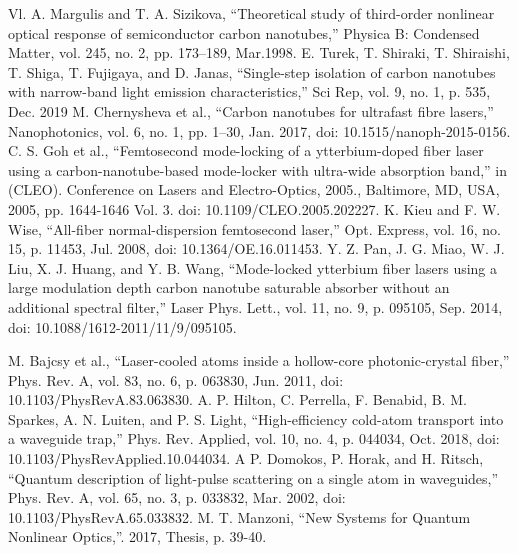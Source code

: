 \begin{thebibliography}{99}
 Vl. A. Margulis and T. A. Sizikova, “Theoretical study of third-order nonlinear optical response of semiconductor carbon nanotubes,” Physica B: Condensed Matter, vol. 245, no. 2, pp. 173–189, Mar.1998.
 E. Turek, T. Shiraki, T. Shiraishi, T. Shiga, T. Fujigaya, and D. Janas, “Single-step isolation of carbon nanotubes with narrow-band light emission characteristics,” Sci Rep, vol. 9, no. 1, p. 535, Dec. 2019
 M. Chernysheva et al., “Carbon nanotubes for ultrafast fibre lasers,” Nanophotonics, vol. 6, no. 1, pp. 1–30, Jan. 2017, doi: 10.1515/nanoph-2015-0156.
 C. S. Goh et al., “Femtosecond mode-locking of a ytterbium-doped fiber laser using a carbon-nanotube-based mode-locker with ultra-wide absorption band,” in (CLEO). Conference on Lasers and Electro-Optics, 2005., Baltimore, MD, USA, 2005, pp. 1644-1646 Vol. 3. doi: 10.1109/CLEO.2005.202227.
 K. Kieu and F. W. Wise, “All-fiber normal-dispersion femtosecond laser,” Opt. Express, vol. 16, no. 15, p. 11453, Jul. 2008, doi: 10.1364/OE.16.011453.
 Y. Z. Pan, J. G. Miao, W. J. Liu, X. J. Huang, and Y. B. Wang, “Mode-locked ytterbium fiber lasers using a large modulation depth carbon nanotube saturable absorber without an additional spectral filter,” Laser Phys. Lett., vol. 11, no. 9, p. 095105, Sep. 2014, doi: 10.1088/1612-2011/11/9/095105.

 M. Bajcsy et al., “Laser-cooled atoms inside a hollow-core photonic-crystal fiber,” Phys. Rev. A, vol. 83, no. 6, p. 063830, Jun. 2011, doi: 10.1103/PhysRevA.83.063830. 
 A. P. Hilton, C. Perrella, F. Benabid, B. M. Sparkes, A. N. Luiten, and P. S. Light, “High-efficiency cold-atom transport into a waveguide trap,” Phys. Rev. Applied, vol. 10, no. 4, p. 044034, Oct. 2018, doi: 10.1103/PhysRevApplied.10.044034. A
 P. Domokos, P. Horak, and H. Ritsch, “Quantum description of light-pulse scattering on a single atom in waveguides,” Phys. Rev. A, vol. 65, no. 3, p. 033832, Mar. 2002, doi: 10.1103/PhysRevA.65.033832.
 M. T. Manzoni, “New Systems for Quantum Nonlinear Optics,”. 2017, Thesis, p. 39-40.


\end{thebibliography}
